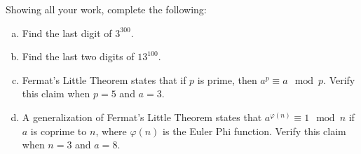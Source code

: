 \documentclass[11pt,letterpaper]{article}
\begin{document}

 Showing all your work, complete the following:
	\begin{enumerate}[(a)]
	\item Find the last digit of $3^{300}$.
	\item Find the last two digits of $13^{100}$.
	\item Fermat's Little Theorem states that if $p$ is prime, then $a^p \equiv a \mod p$. Verify this claim when $p= 5$ and $a= 3$. 
	\item A generalization of Fermat's Little Theorem states that $a^{\varphi(n)} \equiv 1 \mod n$ if $a$ is coprime to $n$, where $\varphi(n)$ is the Euler Phi function. Verify this claim when $n= 3$ and $a= 8$. 
	\end{enumerate} \pspace
\end{document}
